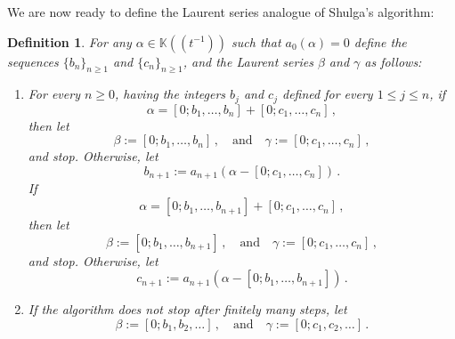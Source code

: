\documentclass[a4paper,12pt]{article}
\newtheorem{defn}[thm]{Definition}
\def\fq{\bbk}
\def\fqttt{\fq\!\left(\!\left(t^{-1}\right)\!\right)}
\def\defeq{:=}
\def\bbk{\mathbb{K}}
\def\defeq{:=}
\begin{document}
We are now ready to define the Laurent series analogue of Shulga's algorithm: 
\begin{defn}\label{def:shulga_an}
For any $\alpha\in\fqttt$ such that $a_0(\alpha)=0$ define the sequences $\{b_n\}_{n\geq1}$ and $\{c_n\}_{n\geq1}$, and the Laurent series $\beta$ and $\gamma$ as follows:
\begin{enumerate}
\item
For every $n\geq0$, having the integers $b_j$ and $c_j$ defined for every $1\leq j\leq n$, if
\begin{equation*}
\alpha=[0;b_1,\ldots,b_{n}]+[0;c_1,\ldots,c_{n}]\,,
\end{equation*}
then let
$$\beta\defeq[0;b_1,\ldots,b_{n}]\,, \quad \textrm{and}\quad \gamma\defeq[0;c_1,\ldots,c_{n}]\,,$$
and stop. Otherwise, let
\begin{equation*}
b_{n+1} \defeq a_{n+1}(\alpha-[0;c_1,\ldots,c_{n}])\,.
\end{equation*}
If 
\begin{equation*}
\alpha=[0;b_1,\ldots,b_{n+1}]+[0;c_1,\ldots,c_{n}]\,,
\end{equation*}
then let 
$$\beta\defeq[0;b_1,\ldots,b_{n+1}]\,, \quad \textrm{and}\quad \gamma\defeq[0;c_1,\ldots,c_{n}]\,,$$ 
and stop. Otherwise, let 
\begin{equation*}
c_{n+1} \defeq a_{n+1}(\alpha-[0;b_1,\ldots,b_{n+1}])\,.
\end{equation*}
\item If the algorithm does not stop after finitely many steps, let 
$$\beta\defeq[0;b_1,b_2,\ldots]\,, \quad \textrm{and}\quad \gamma\defeq[0;c_1,c_2,\ldots]\,.$$ 
\end{enumerate}
\end{defn}

\end{document}
